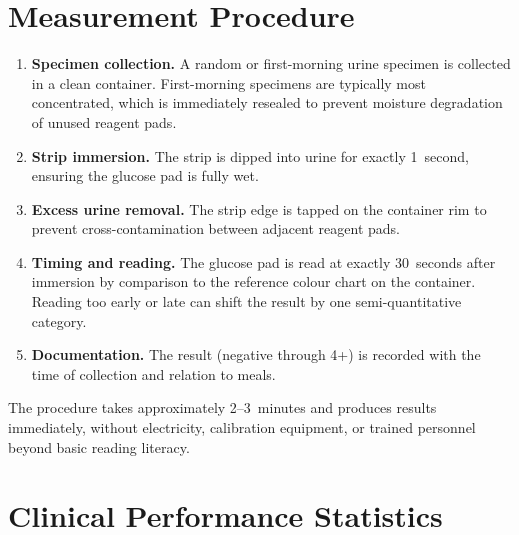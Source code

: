 \section{Measurement Procedure}

\begin{enumerate}
  \item \textbf{Specimen collection.} A random or first-morning urine specimen is collected in a clean container. First-morning specimens are typically most concentrated, which is immediately resealed to prevent moisture degradation of unused reagent pads.
  \item \textbf{Strip immersion.} The strip is dipped into urine for exactly 1~second, ensuring the glucose pad is fully wet.
  \item \textbf{Excess urine removal.} The strip edge is tapped on the container rim to prevent cross-contamination between adjacent reagent pads.
  \item \textbf{Timing and reading.} The glucose pad is read at exactly 30~seconds after immersion by comparison to the reference colour chart on the container. Reading too early or late can shift the result by one semi-quantitative category.
  \item \textbf{Documentation.} The result (negative through 4+) is recorded with the time of collection and relation to meals.
\end{enumerate}

The procedure takes approximately 2--3~minutes and produces results immediately, without electricity, calibration equipment, or trained personnel beyond basic reading literacy.

\section{Clinical Performance Statistics}


